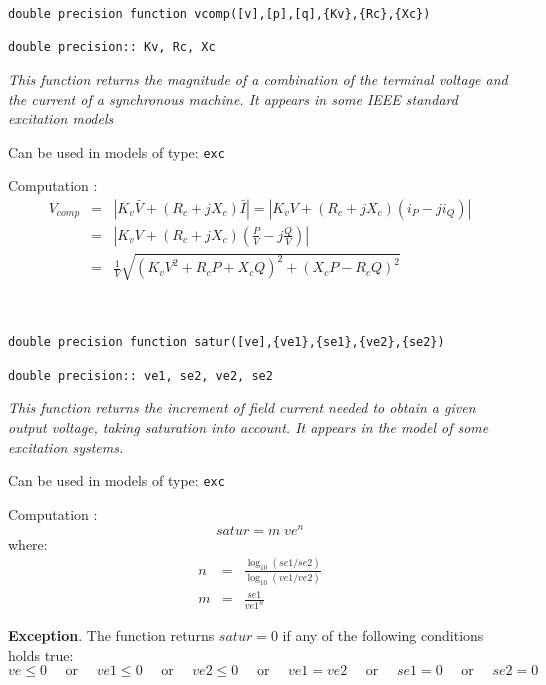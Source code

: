 ~ \hrulefill ~

{\large \tt double precision function vcomp([v],[p],[q],\{Kv\},\{Rc\},\{Xc\})}

\hspace*{10ex} {\tt double precision:: Kv, Rc, Xc}

{\it This function returns the magnitude of a combination of the terminal voltage and the current of a synchronous machine. It appears in some IEEE standard excitation models}

Can be used in models of type: {\tt exc}

Computation :
\begin{eqnarray}
V_{comp} & = & | K_v \bar{V} + (R_c + j X_c) \bar{I} | = | K_v V + (R_c + j X_c) (i_P - j i_Q) | \nonumber \\
& = & | K_v V + (R_c + j X_c) (\frac{P}{V} - j \frac{Q}{V}) | \nonumber \\
& = & \frac{1}{V} \sqrt{(K_v V^2 + R_c P + X_c Q)^2 + (X_c P - R_c Q)^2} \nonumber
\end{eqnarray}

~ \hrulefill ~

{\large \tt double precision function satur([ve],\{ve1\},\{se1\},\{ve2\},\{se2\})}

\hspace*{10ex} {\tt double precision:: ve1, se2, ve2, se2}

{\it This function returns the increment of field current needed to obtain a given output voltage, taking saturation into account. It appears in the model of some excitation systems.}

Can be used in models of type: {\tt exc}

Computation :
\[ satur= m \; ve^n \]
where:
\begin{eqnarray}
n & = & \frac{\log_{10}(se1/se2)}{\log_{10}(ve1/ve2)} \nonumber \\
m & = & \frac{se1}{ve1^n} \nonumber
\end{eqnarray}

{\bf Exception}. The function returns $satur=0$ if any of the following conditions holds true:
\[ ve \le 0 \mbox{~~~~or~~~~} ve1 \le 0 \mbox{~~~~or~~~~} ve2 \le 0 \mbox{~~~~or~~~~} ve1=ve2 \mbox{~~~~or~~~~} se1=0 \mbox{~~~~or~~~~} se2=0 \]

